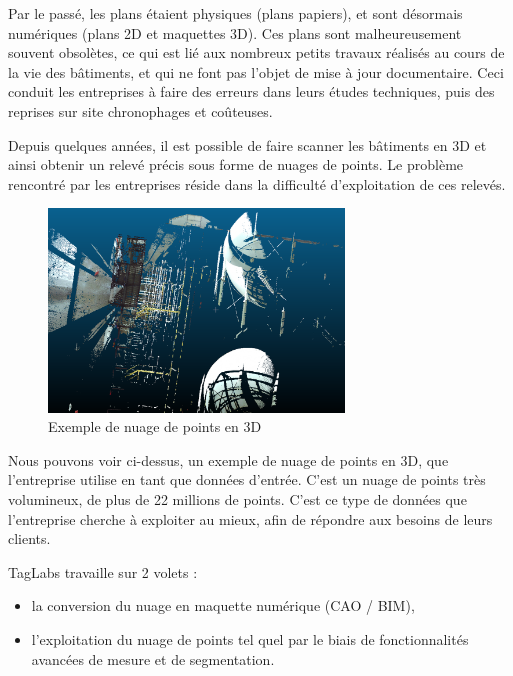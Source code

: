 \documentclass[12pt,titlepage,french]{article}
\begin{document}
Par le passé, les plans étaient physiques (plans papiers), et sont désormais numériques (plans 2D et maquettes 3D). Ces plans sont malheureusement souvent obsolètes, ce qui est lié aux nombreux petits travaux réalisés au cours de la vie des bâtiments, et qui ne font pas l’objet de mise à jour documentaire. Ceci conduit les entreprises à faire des erreurs dans leurs études techniques, puis des reprises sur site chronophages et coûteuses. \newline

Depuis quelques années, il est possible de faire scanner les bâtiments en 3D et ainsi obtenir un relevé précis sous forme de nuages de points. Le problème rencontré par les entreprises réside dans la difficulté d’exploitation de ces relevés.\newline

\begin{figure}[H]
\center
\includegraphics[width=0.7\textwidth]{./img/exemple_ndp.PNG}
    \caption{\label{} Exemple de nuage de points en 3D}
\end{figure}

Nous pouvons voir ci-dessus, un exemple de nuage de points en 3D, que l'entreprise utilise en tant que données d'entrée. C'est un nuage de points très volumineux, de plus de 22 millions de points. C'est ce type de données que l'entreprise cherche à exploiter au mieux, afin de répondre aux besoins de leurs clients.\newline

TagLabs travaille sur 2 volets :

\begin{itemize}
    \item la conversion du nuage en maquette numérique (CAO / BIM),
    \item l’exploitation du nuage de points tel quel par le biais de fonctionnalités avancées de mesure et de segmentation. \newline
\end{itemize}
\end{document}
